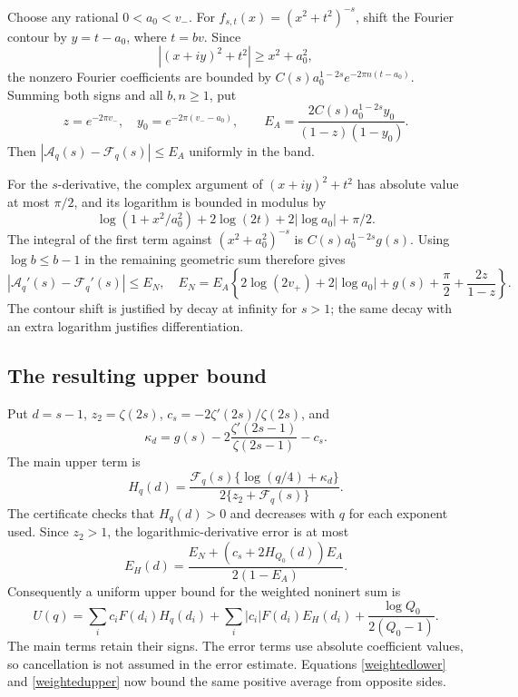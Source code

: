 \documentclass[11pt]{article}
\begin{document}
Choose any rational \(0<a_0<v_-\). For
\(f_{s,t}(x)=(x^2+t^2)^{-s}\), shift the Fourier contour by
\(y=t-a_0\), where \(t=bv\). Since
\[
 |(x+iy)^2+t^2|\ge x^2+a_0^2,
\]
the nonzero Fourier coefficients are bounded by
\(C(s)a_0^{1-2s}e^{-2\pi n(t-a_0)}\). Summing both signs and
all \(b,n\ge1\), put
\[
 z=e^{-2\pi v_-},\quad y_0=e^{-2\pi(v_--a_0)},\qquad
 E_A=\frac{2C(s)a_0^{1-2s}y_0}{(1-z)(1-y_0)}.
\]
Then \(|\mathcal A_q(s)-\mathcal F_q(s)|\le E_A\) uniformly in
the band.

For the \(s\)-derivative, the complex argument of
\((x+iy)^2+t^2\) has absolute value at most \(\pi/2\), and its
logarithm is bounded in modulus by
\[
 \log(1+x^2/a_0^2)+2\log(2t)+2|\log a_0|+\pi/2.
\]
The integral of the first term against
\((x^2+a_0^2)^{-s}\) is
\(C(s)a_0^{1-2s}g(s)\). Using \(\log b\le b-1\) in the remaining
geometric sum therefore gives
\begin{equation}\label{EN}
 |\mathcal A_q'(s)-\mathcal F_q'(s)|\le E_N,
 \quad E_N=E_A\left\{2\log(2v_+)+2|\log a_0|+g(s)+\frac\pi2
                                      +\frac{2z}{1-z}\right\}.
\end{equation}
The contour shift is justified by decay at infinity for \(s>1\);
the same decay with an extra logarithm justifies differentiation.

\subsection{The resulting upper bound}
Put \(d=s-1\), \(z_2=\zeta(2s)\),
\(c_s=-2\zeta'(2s)/\zeta(2s)\), and
\[
 \kappa_d=g(s)-2\frac{\zeta'(2s-1)}{\zeta(2s-1)}-c_s.
\]
The main upper term is
\begin{equation}\label{Hmain}
 H_q(d)=\frac{\mathcal F_q(s)\{\log(q/4)+\kappa_d\}}
                   {2\{z_2+\mathcal F_q(s)\}}.
\end{equation}
The certificate checks that \(H_q(d)>0\) and decreases with \(q\)
for each exponent used. Since \(z_2>1\), the logarithmic-derivative
error is at most
\begin{equation}\label{Herror}
 E_H(d)=\frac{E_N+(c_s+2H_{Q_0}(d))E_A}{2(1-E_A)}.
\end{equation}
Consequently a uniform upper bound for the weighted noninert sum is
\begin{equation}\label{weightedupper}
 U(q)=\sum_i c_iF(d_i)H_q(d_i)
       +\sum_i|c_i|F(d_i)E_H(d_i)
       +\frac{\log Q_0}{2(Q_0-1)}.
\end{equation}
The main terms retain their signs. The error terms use absolute
coefficient values, so cancellation is not assumed in the error
estimate. Equations \eqref{weightedlower} and \eqref{weightedupper}
now bound the same positive average from opposite sides.
\end{document}
